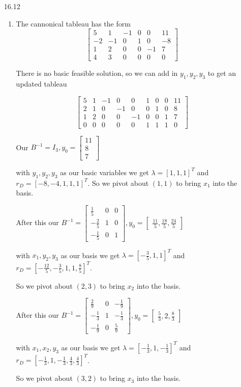 \documentclass[10pt,a4paper]{article}
\newcommand\m[1]{\begin{bmatrix}#1\end{bmatrix}}
\begin{document}
\begin{enumerate}
    \item [16.12]
    \begin{enumerate}    
        \item The cannonical tableau has the form
        $$\m{5 & 1 & -1 & 0 & 0 & 11 \\
             -2 & -1 & 0 & 1 & 0 & -8 \\
             1 & 2 & 0 & 0 & -1 & 7 \\
             4 & 3 & 0 & 0 &0 & 0
        }$$

        There is no basic feasible solution, so we can add in $y_1, y_2, y_3$ to get an updated tableau

        $$\m{5 & 1 & -1 & 0 & 0 & 1 & 0 & 0 & 11 \\
             2 & 1 & 0 & -1 & 0 & 0 & 1 & 0& 8 \\
             1 & 2 & 0 & 0 & -1 & 0 & 0 &1 &7 \\
             0 & 0 & 0 & 0  &0 & 1 & 1 & 1 & 0
        }$$

        Our $B^{-1} = I_3, y_0 = \m{11 \\ 8 \\7}$ 

        with $y_1, y_2, y_3$ as our basic variables we get $\lambda = [1, 1, 1]^T$ and $r_D = [-8, -4, 1, 1, 1]^T$.
        So we pivot about $(1, 1)$ to bring $x_1$ into the basis.

        After this our $B^{-1} = \m{\frac{1}{5} & 0 & 0 \\ -\frac{2}{5} & 1 & 0 \\ -\frac{1}{5} & 0 & 1}, y_0 = \m{\frac{11}{5}, \frac{18}{5}, \frac{24}{5}}$

        with $x_1, y_2, y_3$ as our basis we get $\lambda = [-\frac{3}{5}, 1, 1]^T$ and $r_D = [-\frac{12}{5}, -\frac{3}{5}, 1, 1, \frac{8}{5}]^T$.

        So we pivot about $(2, 3)$ to bring $x_2$ into the basis.

        After this our $B^{-1} = \m{\frac{2}{9} & 0 & -\frac{1}{9} \\ -\frac{1}{3} & 1 & -\frac{1}{3} \\ -\frac{1}{9} & 0 & \frac{5}{9}}, y_0 = \m{\frac{5}{3}, 2, \frac{8}{3}}$

        with $x_1, x_2, y_3$ as our basis we get $\lambda = [-\frac{1}{3}, 1, -\frac{1}{3}]^T$ and $r_D = [-\frac{1}{3}, 1, -\frac{1}{3}, \frac{4}{3}, \frac{4}{3}]^T$.

        So we pivot about $(3, 2)$ to bring $x_3$ into the basis.


\end{enumerate}
\end{enumerate}
\end{document}
